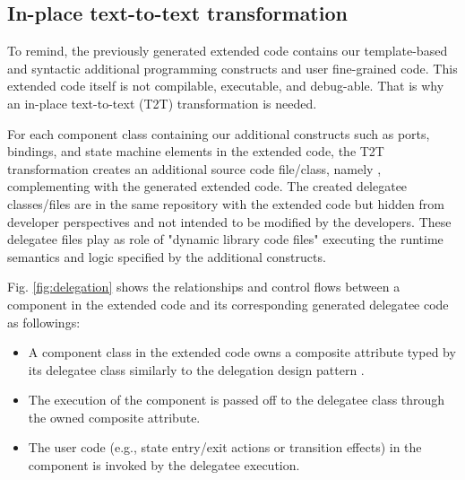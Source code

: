 \subsection{In-place text-to-text transformation}
\label{subsec:compilation}
To remind, the previously generated extended code contains our template-based and syntactic additional programming constructs and user fine-grained code. 
This extended code itself is not compilable, executable, and debug-able. 
That is why an in-place text-to-text (T2T) transformation is needed. %

For each component class containing our additional constructs such as ports, bindings, and state machine elements in the extended code, the T2T transformation creates an additional source code file/class, namely , complementing with the generated extended code.
The created delegatee classes/files are in the same repository with the extended code but hidden from developer perspectives and not intended to be modified by the developers.
These delegatee files play as role of "dynamic library code files" executing the runtime semantics and logic specified by the additional constructs.

Fig. \ref{fig:delegation} shows the relationships and control flows between a component in the extended code and its corresponding generated delegatee code as followings:

\begin{itemize}[\footnotesize]
	\item A component class in the extended code owns a composite attribute typed by its delegatee class similarly to the delegation design pattern \cite{gamma1995design}.
	
	\item The execution of the component is passed off to the delegatee class through the owned composite attribute.
	
	\item The user code (e.g., state entry/exit actions or transition effects) in the component is invoked by the delegatee execution. 
\end{itemize}


